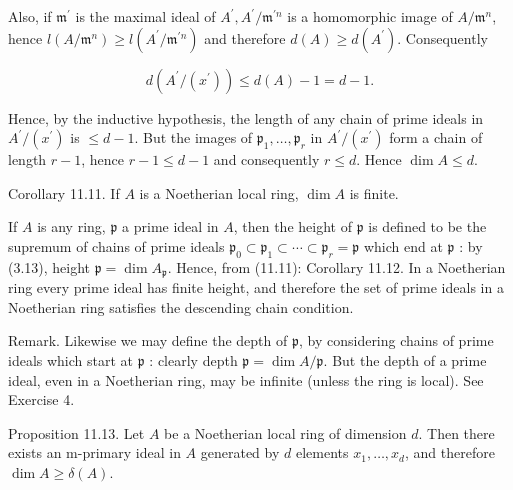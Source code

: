 \documentclass{standalone}
\theoremstyle{definition}
\theoremstyle{remark}
\begin{document}
Also, if $\mathfrak{m}^{\prime}$ is the maximal ideal of $A^{\prime}, A^{\prime} / \mathfrak{m}^{\prime n}$ is a homomorphic image of $A / \mathfrak{m}^{n}$, hence $l\left(A / \mathfrak{m}^{n}\right) \geqslant l\left(A^{\prime} / \mathfrak{m}^{\prime n}\right)$ and therefore $d(A) \geqslant d\left(A^{\prime}\right)$. Consequently

\[
d\left(A^{\prime} /\left(x^{\prime}\right)\right) \leqslant d(A)-1=d-1 .
\]

Hence, by the inductive hypothesis, the length of any chain of prime ideals in $A^{\prime} /\left(x^{\prime}\right)$ is $\leqslant d-1$. But the images of $\mathfrak{p}_{1}, \ldots, \mathfrak{p}_{r}$ in $A^{\prime} /\left(x^{\prime}\right)$ form a chain of length $r-1$, hence $r-1 \leqslant d-1$ and consequently $r \leqslant d$. Hence $\operatorname{dim} A \leqslant d$.

Corollary 11.11. If $A$ is a Noetherian local ring, $\operatorname{dim} A$ is finite.

If $A$ is any ring, $\mathfrak{p}$ a prime ideal in $A$, then the height of $\mathfrak{p}$ is defined to be the supremum of chains of prime ideals $\mathfrak{p}_{0} \subset \mathfrak{p}_{1} \subset \cdots \subset \mathfrak{p}_{r}=\mathfrak{p}$ which end at $\mathfrak{p}$ : by (3.13), height $\mathfrak{p}=\operatorname{dim} A_{\mathfrak{p}}$. Hence, from (11.11): Corollary 11.12. In a Noetherian ring every prime ideal has finite height, and therefore the set of prime ideals in a Noetherian ring satisfies the descending chain condition.

Remark. Likewise we may define the depth of $\mathfrak{p}$, by considering chains of prime ideals which start at $\mathfrak{p}$ : clearly depth $\mathfrak{p}=\operatorname{dim} A / \mathfrak{p}$. But the depth of a prime ideal, even in a Noetherian ring, may be infinite (unless the ring is local). See Exercise 4.

Proposition 11.13. Let $A$ be a Noetherian local ring of dimension $d$. Then there exists an $\mathrm{m}$-primary ideal in $A$ generated by $d$ elements $x_{1}, \ldots, x_{d}$, and therefore $\operatorname{dim} A \geqslant \delta(A)$.
\end{document}
